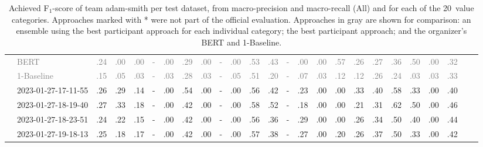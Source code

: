 \begin{table*}
\begin{tabular}{@{}ll@{\hspace{10pt}}c@{\hspace{5pt}}cccccccccccccccccccccc@{}}
& \textcolor{gray}{BERT} & \textcolor{gray}{.24} & \textcolor{gray}{.00} & \textcolor{gray}{.00} & \textcolor{gray}{-} & \textcolor{gray}{.00} & \textcolor{gray}{.29} & \textcolor{gray}{.00} & \textcolor{gray}{-} & \textcolor{gray}{.00} & \textcolor{gray}{.53} & \textcolor{gray}{.43} & \textcolor{gray}{-} & \textcolor{gray}{.00} & \textcolor{gray}{.00} & \textcolor{gray}{.57} & \textcolor{gray}{.26} & \textcolor{gray}{.27} & \textcolor{gray}{.36} & \textcolor{gray}{.50} & \textcolor{gray}{.00} & \textcolor{gray}{.32} \\
& \textcolor{gray}{1-Baseline} & \textcolor{gray}{.15} & \textcolor{gray}{.05} & \textcolor{gray}{.03} & \textcolor{gray}{-} & \textcolor{gray}{.03} & \textcolor{gray}{.28} & \textcolor{gray}{.03} & \textcolor{gray}{-} & \textcolor{gray}{.05} & \textcolor{gray}{.51} & \textcolor{gray}{.20} & \textcolor{gray}{-} & \textcolor{gray}{.07} & \textcolor{gray}{.03} & \textcolor{gray}{.12} & \textcolor{gray}{.12} & \textcolor{gray}{.26} & \textcolor{gray}{.24} & \textcolor{gray}{.03} & \textcolor{gray}{.03} & \textcolor{gray}{.33} \\
& 2023-01-27-17-11-55 & .26 & .29 & .14 & - & .00 & .54 & .00 & - & .00 & .56 & .42 & - & .23 & .00 & .00 & .33 & .40 & .58 & .33 & .00 & .40 \\
& 2023-01-27-18-19-40 & .27 & .33 & .18 & - & .00 & .42 & .00 & - & .00 & .58 & .52 & - & .18 & .00 & .00 & .21 & .31 & .62 & .50 & .00 & .46 \\
& 2023-01-27-18-23-51 & .24 & .22 & .15 & - & .00 & .42 & .00 & - & .00 & .56 & .36 & - & .29 & .00 & .00 & .26 & .34 & .50 & .40 & .00 & .44 \\
& 2023-01-27-19-18-13 & .25 & .18 & .17 & - & .00 & .42 & .00 & - & .00 & .57 & .38 & - & .27 & .00 & .20 & .26 & .37 & .50 & .33 & .00 & .42 \\
\bottomrule
\end{tabular}
\caption{Achieved F$_1$-score of team adam-smith per test dataset, from macro-precision and macro-recall (All) and for each of the 20~value categories. Approaches marked with * were not part of the official evaluation. Approaches in gray are shown for comparison: an ensemble using the best participant approach for each individual category; the best participant approach; and the organizer's BERT and 1-Baseline.}
\label{table-results}
\end{table*}

